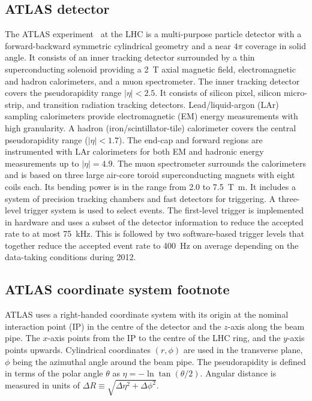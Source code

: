 \subsection{ATLAS detector}
\label{sec:atlas1}

The ATLAS experiment~\cite{atlas-detector} at the LHC is a multi-purpose particle detector
with a forward-backward symmetric cylindrical geometry and a near $4\pi$ coverage in solid angle.
It consists of an inner tracking detector surrounded by a thin superconducting solenoid
providing a \SI{2}{\tesla} axial magnetic field, electromagnetic and hadron calorimeters, and a muon spectrometer.
The inner tracking detector covers the pseudorapidity range $|\eta| < 2.5$.
It consists of silicon pixel, silicon micro-strip, and transition radiation tracking detectors.
Lead/liquid-argon (LAr) sampling calorimeters provide electromagnetic (EM) energy measurements
with high granularity.
A hadron (iron/scintillator-tile) calorimeter covers the central pseudorapidity range ($|\eta| < 1.7$).
The end-cap and forward regions are instrumented with LAr calorimeters
for both EM and hadronic energy measurements up to $|\eta| = 4.9$.
The muon spectrometer surrounds the calorimeters and is based on
three large air-core toroid superconducting magnets with eight coils each.
Its bending power is in the range from \num{2.0} to \SI{7.5}{\tesla\metre}.
It includes a system of precision tracking chambers and fast detectors for triggering.
A three-level trigger system is used to select events.
The first-level trigger is implemented in hardware and uses a subset of the detector information
to reduce the accepted rate to at most \SI{75}{\kilo\hertz}.
This is followed by two software-based trigger levels that
together reduce the accepted event rate to \SI{400}{\hertz} on average
depending on the data-taking conditions during 2012.


\subsection{ATLAS coordinate system footnote}
\label{sec:coord}

ATLAS uses a right-handed coordinate system with its origin at the nominal interaction point (IP)
in the centre of the detector and the $z$-axis along the beam pipe.
The $x$-axis points from the IP to the centre of the LHC ring,
and the $y$-axis points upwards.
Cylindrical coordinates $(r,\phi)$ are used in the transverse plane, 
$\phi$ being the azimuthal angle around the beam pipe.
The pseudorapidity is defined in terms of the polar angle $\theta$ as $\eta = -\ln \tan(\theta/2)$.
Angular distance is measured in units of $\Delta R \equiv \sqrt{\Delta\eta^{2} + \Delta\phi^{2}}$.